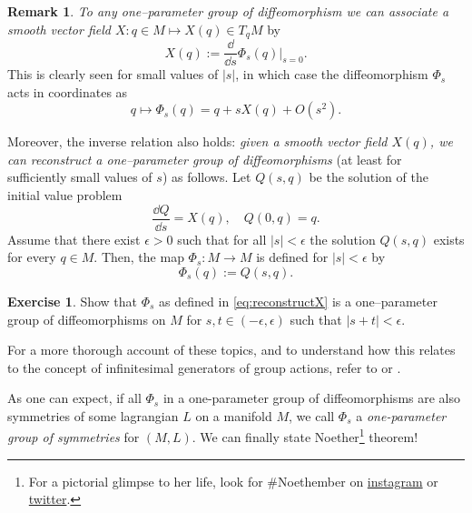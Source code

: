 \documentclass[english,fontsize=11pt,paper=b5]{scrbook}
\theoremstyle{definition}
\newtheorem{remark}{Remark}[chapter]
\newtheorem{exercise}{Exercise}[chapter]
\begin{document}
    \begin{remark}
      \emph{To any one--parameter group of diffeomorphism we can associate a smooth vector field $X : q\in M \mapsto X(q)\in T_qM$} by
      \begin{equation}
        X(q) := \frac{\dd}{\dd s} \Phi_s(q) \Big|_{s=0}.
      \end{equation}
      This is clearly seen for small values of $|s|$, in which case the diffeomorphism $\Phi_s$ acts in coordinates as
      \begin{equation}\label{eq:infinitesimalSymmetryExp}
        q \mapsto \Phi_s(q) = q + s X(q) + O(s^2).
      \end{equation}

      Moreover, the inverse relation also holds: \emph{given a smooth vector field $X(q)$, we can reconstruct a one--parameter group of diffeomorphisms} (at least for sufficiently small values of $s$) as follows.
      Let $Q(s, q)$ be the solution of the initial value problem
      \begin{equation}\label{eq:NoetherCoords}
        \frac{\dd Q}{\dd s} = X(q), \quad Q(0, q) = q.
      \end{equation}
      Assume that there exist $\epsilon >0$ such that for all $|s|<\epsilon$ the solution $Q(s,q)$ exists for every $q\in M$.
      Then, the map $\Phi_s:M\to M$ is defined for $|s|<\epsilon$ by
      \begin{equation}\label{eq:reconstructX}
        \Phi_s(q) := Q(s, q).
      \end{equation}

      \begin{exercise}
        Show that $\Phi_s$ as defined in \eqref{eq:reconstructX} is a one--parameter group of diffeomorphisms on $M$ for $s,t \in(-\epsilon,\epsilon)$ such that $|s + t| < \epsilon$.
      \end{exercise}

      For a more thorough account of these topics, and to understand how this relates to the concept of infinitesimal generators of group actions, refer to \cite[Chapters 9 and 20]{book:lee} or \cite[Chapters 3 and 4]{lectures:aom:seri}.
    \end{remark}

    As one can expect, if all $\Phi_s$ in a one-parameter group of diffeomorphisms are also symmetries of some lagrangian $L$ on a manifold $M$, we call $\Phi_s$ a \emph{one-parameter group of symmetries} for $(M,L)$. We can finally state Noether\footnote{For a pictorial glimpse to her life, look for \#Noethember on \href{https://www.instagram.com/explore/tags/noethember/}{instagram} or \href{https://twitter.com/search?q=noethember}{twitter}.} theorem!
\end{document}
